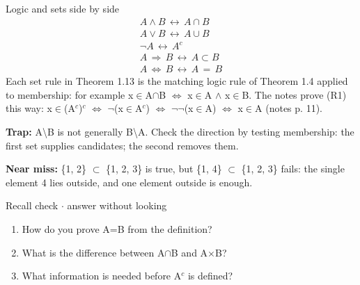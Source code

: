 \documentclass[11pt]{article}
\begin{document}
\begin{keepsection}
\begin{keepsection}
\begin{equationcard}{Logic and sets side by side}
\[ \begin{gathered} {A}\land {B}\, \leftrightarrow \, {A}\cap {B} \\ {A}\lor {B}\, \leftrightarrow \, {A}\cup {B} \\ \neg {A}\, \leftrightarrow \, {A}^{c} \\ {A}\, \Rightarrow \, {B}\, \leftrightarrow \, {A}\subset {B} \\ {A}\, \Leftrightarrow \, {B}\, \leftrightarrow \, {A}\, =\, {B} \end{gathered} \]
{\small Each set rule in Theorem 1.13 is the matching logic rule of Theorem 1.4 applied to membership: for example x\ensuremath{\in}A\ensuremath{\cap}B \ensuremath{\Leftrightarrow} x\ensuremath{\in}A \ensuremath{\land} x\ensuremath{\in}B. The notes prove (R1) this way: x\ensuremath{\in}(A\ensuremath{^{c}})\ensuremath{^{c}} \ensuremath{\Leftrightarrow} \ensuremath{\neg}(x\ensuremath{\in}A\ensuremath{^{c}}) \ensuremath{\Leftrightarrow} \ensuremath{\neg}\ensuremath{\neg}(x\ensuremath{\in}A) \ensuremath{\Leftrightarrow} x\ensuremath{\in}A (notes p. 11).}
\end{equationcard}

\begin{notebox}\textbf{Trap:} A\textbackslash{}B is not generally B\textbackslash{}A. Check the direction by testing membership: the first set supplies candidates; the second removes them.\end{notebox}

\begin{notebox}\textbf{Near miss:} \{1, 2\} \ensuremath{\subset} \{1, 2, 3\} is true, but \{1, 4\} \ensuremath{\subset} \{1, 2, 3\} fails: the single element 4 lies outside, and one element outside is enough.\end{notebox}

\begin{recallbox}{Recall check \ensuremath{\cdot} answer without looking}
\begin{enumerate}
\item How do you prove A=B from the definition?
\item What is the difference between A\ensuremath{\cap}B and A\ensuremath{\times}B?
\item What information is needed before A\ensuremath{^{c}} is defined?
\end{enumerate}

\end{recallbox}
\end{keepsection}
\end{keepsection}
\end{document}
